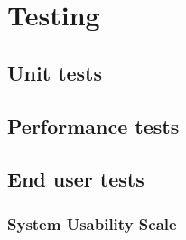 \chapter{Testing}
\section{Unit tests}
\section{Performance tests}
\section{End user tests}
\subsection{System Usability Scale}